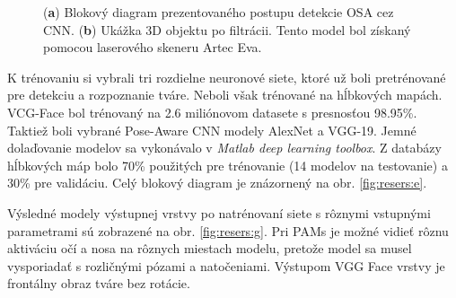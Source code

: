 \begin{figure}[h]
\begin{subfigure}[b]{0.37\textwidth}
		\caption{}
		\label{fig:resers:f}
	\end{subfigure}
	\caption{(\textbf{a}) Blokový diagram prezentovaného postupu detekcie OSA cez CNN. 
	(\textbf{b}) Ukážka 3D objektu po filtrácii. Tento model bol získaný pomocou laserového skeneru Artec Eva.} 
\label{fig:resers:2}
\end{figure}

K trénovaniu si vybrali tri rozdielne neuronové siete, ktoré už boli pretrénované pre detekciu a rozpoznanie tváre. Neboli však trénované na hĺbkových mapách.  VCG-Face bol trénovaný na 2.6 miliónovom datasete s presnosťou 98.95\%. Taktiež boli vybrané Pose-Aware CNN modely AlexNet a VGG-19. 
Jemné dolaďovanie modelov sa vykonávalo v \textit{Matlab deep learning toolbox}. Z databázy hĺbkových máp bolo 70\% použitých pre trénovanie (14 modelov na testovanie) a 30\% pre validáciu. Celý blokový diagram je znázornený na obr. \ref{fig:resers:e}. 

Výsledné modely výstupnej vrstvy po natrénovaní siete s rôznymi vstupnými parametrami sú zobrazené na obr. \ref{fig:resers:g}. Pri PAMs je možné vidieť rôznu aktiváciu očí a nosa na rôznych miestach modelu, pretože model sa musel vysporiadať s rozličnými pózami a natočeniami.  Výstupom VGG Face vrstvy je frontálny obraz tváre bez rotácie.

